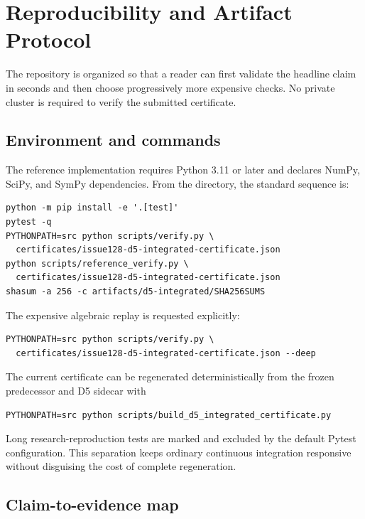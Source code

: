 \section{Reproducibility and Artifact Protocol}
\label{sec:reproducibility}

The repository is organized so that a reader can first validate the headline
claim in seconds and then choose progressively more expensive checks.  No
private cluster is required to verify the submitted certificate.

\subsection{Environment and commands}

The reference implementation requires Python 3.11 or later and declares
NumPy, SciPy, and SymPy dependencies.  From the  directory, the
standard sequence is:
\begin{verbatim}
python -m pip install -e '.[test]'
pytest -q
PYTHONPATH=src python scripts/verify.py \
  certificates/issue128-d5-integrated-certificate.json
python scripts/reference_verify.py \
  certificates/issue128-d5-integrated-certificate.json
shasum -a 256 -c artifacts/d5-integrated/SHA256SUMS
\end{verbatim}
The expensive algebraic replay is requested explicitly:
\begin{verbatim}
PYTHONPATH=src python scripts/verify.py \
  certificates/issue128-d5-integrated-certificate.json --deep
\end{verbatim}
The current certificate can be regenerated deterministically from the frozen
predecessor and D5 sidecar with
\begin{verbatim}
PYTHONPATH=src python scripts/build_d5_integrated_certificate.py
\end{verbatim}
Long research-reproduction tests are marked  and excluded by the
default Pytest configuration.  This separation keeps ordinary continuous
integration responsive without disguising the cost of complete regeneration.

\subsection{Claim-to-evidence map}

